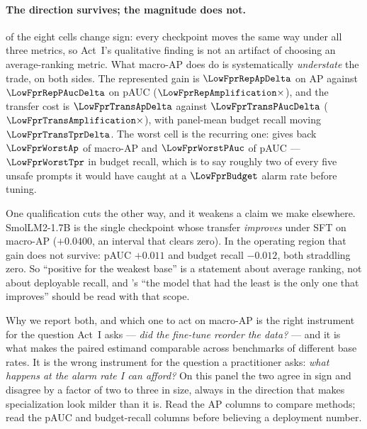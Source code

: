 

\paragraph{The direction survives; the magnitude does not.} \LowFprSignFlips{} of the eight cells
change sign: every checkpoint moves the same way under all three metrics, so Act~I's qualitative
finding is not an artifact of choosing an average-ranking metric. What macro-AP does do is
systematically \emph{understate} the trade, on both sides. The represented gain is
$\LowFprRepApDelta$ on AP against $\LowFprRepPAucDelta$ on pAUC
($\LowFprRepAmplification\times$), and the transfer cost is $\LowFprTransApDelta$ against
$\LowFprTransPAucDelta$ ($\LowFprTransAmplification\times$), with panel-mean budget recall moving
$\LowFprTransTprDelta$. The worst cell is the recurring one: \LowFprWorstName{} gives back
$\LowFprWorstAp$ of macro-AP and $\LowFprWorstPAuc$ \LowFprWorstPAucCI{} of pAUC ---
$\LowFprWorstTpr$ in budget recall, which is to say roughly two of every five unsafe prompts it
would have caught at a $\LowFprBudget$ alarm rate before tuning.

One qualification cuts the other way, and it weakens a claim we make elsewhere. SmolLM2-1.7B is the
single checkpoint whose transfer \emph{improves} under SFT on macro-AP ($+0.0400$, an interval that
clears zero). In the operating region that gain does not survive: pAUC $+0.011$ and budget recall
$-0.012$, both straddling zero. So ``positive for the weakest base'' is a statement about average
ranking, not about deployable recall, and 's ``the model that had the least
is the only one that improves'' should be read with that scope.

\begin{takeaway}{Why we report both, and which one to act on}
macro-AP is the right instrument for the question Act~I asks --- \emph{did the fine-tune reorder the
data?} --- and it is what makes the paired estimand comparable across benchmarks of different base
rates. It is the wrong instrument for the question a practitioner asks: \emph{what happens at the
alarm rate I can afford?} On this panel the two agree in sign and disagree by a factor of two to
three in size, always in the direction that makes specialization look milder than it is. Read the
AP columns to compare methods; read the pAUC and budget-recall columns before believing a
deployment number.
\end{takeaway}

